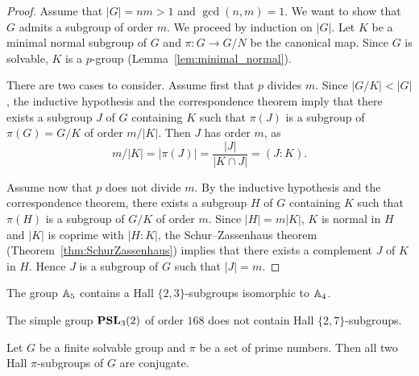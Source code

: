 \begin{proof}
	Assume that $|G|=nm>1$ and $\gcd(n,m)=1$. We want to show that $G$ admits a
	subgroup of order $m$. We proceed by induction on $|G|$. Let $K$ be a minimal
	normal subgroup of $G$ and $\pi\colon G\to G/N$ be the canonical map. Since $G$
	is solvable, $K$ is a $p$-group (Lemma~\ref{lem:minimal_normal}).
	
	There are two cases to consider. Assume first that $p$ divides $m$. Since
	$|G/K|<|G|$, the inductive hypothesis and the correspondence theorem imply that
	there exists a subgroup $J$ of $G$ containing $K$ such that $\pi(J)$ is a
	subgroup of 
    $\pi(G)=G/K$ of order $m/|K|$. Then $J$ has order $m$, as 
    \[
	m/|K|=|\pi(J)|=\frac{|J|}{|K\cap J|}=(J:K).
	\]

	Assume now that $p$ does not divide $m$. By the inductive hypothesis and the
	correspondence theorem, there exists a subgroup $H$ of $G$ containing $K$ such
	that $\pi(H)$ is a subgroup of $G/K$ of order $m$. Since $|H|=m|K|$, $K$ is
	normal in $H$ and $|K|$ is coprime with $|H:K|$, the Schur--Zassenhaus theorem
	(Theorem~\ref{thm:SchurZassenhaus}) implies that there exists a complement $J$
	of $K$ in $H$. Hence $J$ is a subgroup of $G$ such that $|J|=m$.
\end{proof}

\begin{example}
	The group $\mathbb{A}_5$ contains a Hall $\{2,3\}$-subgroups isomorphic to 
 	$\mathbb{A}_4$.
\end{example}

\begin{example}
	The simple group $\mathbf{PSL}_3(2)$ of order $168$ does not contain Hall $\{2,7\}$-subgroups.
\end{example}

\begin{theorem}
	\label{theorem:HallC}
	Let $G$ be a finite solvable group and $\pi$ be a set of prime numbers. 
    Then all two Hall $\pi$-subgroups of $G$ are conjugate. 
\end{theorem}

